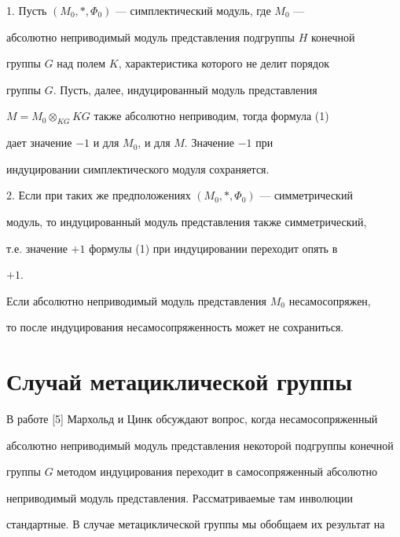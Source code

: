 \begin{cornonum}


1. Пусть $(M_0,*,\Phi_0)$ --- симплектический модуль, где $M_0$ ---


абсолютно неприводимый модуль представления подгруппы $H$ конечной


группы $G$ над полем $K$, характеристика которого не делит порядок


группы $G$. Пусть, далее, индуцированный модуль представления


$M=M_0\otimes_{KG}KG$ также абсолютно неприводим, тогда формула (1)


дает значение $-1$ и для $M_0$, и для $M$. Значение $-1$ при


индуцировании симплектического модуля сохраняется.





2. Если при таких же предположениях $(M_0,*,\Phi_0)$ --- симметрический


модуль, то индуцированный модуль представления также симметрический,


т.е. значение $+1$ формулы (1) при индуцировании переходит опять в


$+1$.





Если абсолютно неприводимый модуль представления $M_0$ несамосопряжен,


то после индуцирования несамосопряженность может не сохраниться.


\end{cornonum}





\section{Случай метациклической группы}





В работе [5] Мархольд и Цинк обсуждают вопрос, когда несамосопряженный


абсолютно неприводимый модуль представления некоторой подгруппы конечной


группы $G$ методом индуцирования переходит в самосопряженный абсолютно


неприводимый модуль представления. Рассматриваемые там инволюции


стандартные. В случае метациклической группы мы обобщаем их результат на



